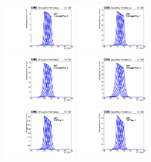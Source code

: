 \begin{figure}[ht!]
\centering
\includegraphics[width=0.33\textwidth]{modellingFigures/DCBpG/ggh_UntaggedTag_0_fmc_interp.pdf} 
\includegraphics[width=0.33\textwidth]{modellingFigures/DCBpG/ggh_UntaggedTag_1_fmc_interp.pdf} \\ 
\includegraphics[width=0.33\textwidth]{modellingFigures/DCBpG/ggh_UntaggedTag_2_fmc_interp.pdf} 
\includegraphics[width=0.33\textwidth]{modellingFigures/DCBpG/ggh_UntaggedTag_3_fmc_interp.pdf} \\
\includegraphics[width=0.33\textwidth]{modellingFigures/DCBpG/ggh_VBFTag_0_fmc_interp.pdf} 
\includegraphics[width=0.33\textwidth]{modellingFigures/DCBpG/ggh_VBFTag_1_fmc_interp.pdf}\\ 

\end{figure}
